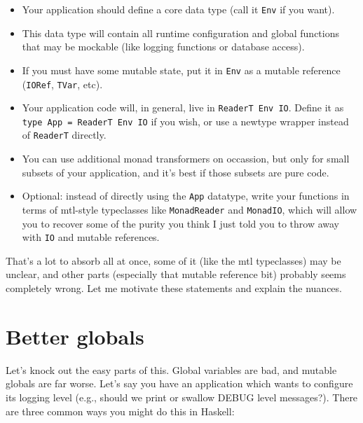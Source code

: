 \begin{itemize}

\item
  Your application should define a core data type (call it \texttt{Env}
  if you want).
\item
  This data type will contain all runtime configuration and global
  functions that may be mockable (like logging functions or database
  access).
\item
  If you must have some mutable state, put it in \texttt{Env} as a
  mutable reference (\texttt{IORef}, \texttt{TVar}, etc).
\item
  Your application code will, in general, live in
  \texttt{ReaderT\ Env\ IO}. Define it as
  \texttt{type\ App\ =\ ReaderT\ Env\ IO} if you wish, or use a newtype
  wrapper instead of \texttt{ReaderT} directly.
\item
  You can use additional monad transformers on occassion, but only for
  small subsets of your application, and it's best if those subsets are
  pure code.
\item
  Optional: instead of directly using the \texttt{App} datatype, write
  your functions in terms of mtl-style typeclasses like
  \texttt{MonadReader} and \texttt{MonadIO}, which will allow you to
  recover some of the purity you think I just told you to throw away
  with \texttt{IO} and mutable references.
\end{itemize}
That's a lot to absorb all at once, some of it (like the mtl
typeclasses) may be unclear, and other parts (especially that mutable
reference bit) probably seems completely wrong. Let me motivate these
statements and explain the nuances.

\section{Better globals}

Let's knock out the easy parts of this. Global variables are bad, and
mutable globals are far worse. Let's say you have an application which
wants to configure its logging level (e.g., should we print or swallow
DEBUG level messages?). There are three common ways you might do this in
Haskell:

